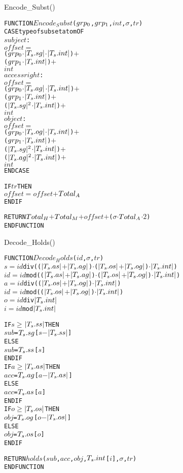 \documentclass[11pt]{report}
\newenvironment{vverbatim}
{
  \begin{alltt}
}
{
    \vspace{-\baselineskip}
  \end{alltt}
}
\newlength{\valgorithmboxwidth}
\newenvironment{valgorithm}[3][tbhp]
{
  \setlength{\valgorithmboxwidth}{\linewidth-2em}

  \begin{valgorithmfloat}[#1]
    \caption{#2}
    \label{#3}
    \hspace{1em}
    \begin{lrbox}{\valgorithmbox}
      \begin{minipage}[l]{\valgorithmboxwidth}
        \small
        \begin{vverbatim}
}
{
        \end{vverbatim}
      \end{minipage}
    \end{lrbox}
    \framebox[\valgorithmboxwidth][l]{\usebox{\valgorithmbox}}
  \end{valgorithmfloat}
}
\begin{document}
        \begin{valgorithm}[tbhp]{Encode\_Subst()}{algo-encode-subst}
FUNCTION \(Encode_Subst\)(\(grp\sb{0}\), \(grp\sb{1}\), \(int\), \(\sigma\), \(tr\))
  CASE type of subset atom OF
    \(subject\) :
      \(offset\) \(=\)
        (\(grp\sb{0}\) \(\cdot\) \(|T\sb{s}.sg|\) \(\cdot\) \(|T\sb{s}.int|\)) \(+\)
        (\(grp\sb{1}\) \(\cdot\) \(|T\sb{s}.int|\)) \(+\)
        \(int\)
    \(access right\) :
      \(offset\) \(=\)
        (\(grp\sb{0}\) \(\cdot\) \(|T\sb{s}.ag|\) \(\cdot\) \(|T\sb{s}.int|\)) \(+\)
        (\(grp\sb{1}\) \(\cdot\) \(|T\sb{s}.int|\)) \(+\)
        (\(|T\sb{s}.sg|\sp{2}\) \(\cdot\) \(|T\sb{s}.int|\)) \(+\)
        \(int\)
    \(object\) :
      \(offset\) \(=\)
        (\(grp\sb{0}\) \(\cdot\) \(|T\sb{s}.og|\) \(\cdot\) \(|T\sb{s}.int|\)) \(+\)
        (\(grp\sb{1}\) \(\cdot\) \(|T\sb{s}.int|\)) \(+\)
        (\(|T\sb{s}.sg|\sp{2}\) \(\cdot\) \(|T\sb{s}.int|\)) \(+\)
        (\(|T\sb{s}.ag|\sp{2}\) \(\cdot\) \(|T\sb{s}.int|\)) \(+\)
        \(int\)
  ENDCASE
    
  IF \(tr\) THEN
    \(offset\) \(=\) \(offset\) \(+\) \(Total\sb{A}\)
  ENDIF

  RETURN \(Total\sb{H}\) \(+\) \(Total\sb{M}\) \(+\) \(offset\) \(+\) (\(\sigma\) \(\cdot\) \(Total\sb{A}\) \(\cdot\) \(2\))
ENDFUNCTION
        \end{valgorithm}


        \begin{valgorithm}[tbhp]{Decode\_Holds()}{algo-decode-holds}
FUNCTION \(Decode_Holds\)(\(id\), \(\sigma\), \(tr\))
  \(s\) \(=\) \(id\) div ((\(|T\sb{s}.as|\) \(+\) \(|T\sb{s}.ag|\)) \(\cdot\) (\(|T\sb{s}.os|\) \(+\) \(|T\sb{s}.og|\)) \(\cdot\) \(|T\sb{s}.int|\))
  \(id\) \(=\) \(id\) mod ((\(|T\sb{s}.as|\) \(+\) \(|T\sb{s}.ag|\)) \(\cdot\) (\(|T\sb{s}.os|\) \(+\) \(|T\sb{s}.og|\)) \(\cdot\) \(|T\sb{s}.int|\))
  \(a\) \(=\) \(id\) div ((\(|T\sb{s}.os|\) \(+\) \(|T\sb{s}.og|\)) \(\cdot\) \(|T\sb{s}.int|\))
  \(id\) \(=\) \(id\) mod ((\(|T\sb{s}.os|\) \(+\) \(|T\sb{s}.og|\)) \(\cdot\) \(|T\sb{s}.int|\))
  \(o\) \(=\) \(id\) div \(|T\sb{s}.int|\)
  \(i\) \(=\) \(id\) mod \(|T\sb{s}.int|\)

  IF \(s\) \(\geq\) \(|T\sb{s}.ss|\) THEN
    \(sub\) = \(T\sb{s}.sg\)[\(s\) \(-\) \(|T\sb{s}.ss|\)]
  ELSE
    \(sub\) = \(T\sb{s}.ss\)[\(s\)]
  ENDIF
  IF \(a\) \(\geq\) \(|T\sb{s}.as|\) THEN
    \(acc\) = \(T\sb{s}.ag\)[\(a\) \(-\) \(|T\sb{s}.as|\)]
  ELSE
    \(acc\) = \(T\sb{s}.as\)[\(a\)]
  ENDIF
  IF \(o\) \(\geq\) \(|T\sb{s}.os|\) THEN
    \(obj\) = \(T\sb{s}.og\)[\(o\) \(-\) \(|T\sb{s}.os|\)]
  ELSE
    \(obj\) = \(T\sb{s}.os\)[\(o\)]
  ENDIF

  RETURN \(holds\)(\(sub\), \(acc\), \(obj\), \(T\sb{s}.int\)[\(i\)], \(\sigma\), \(tr\))
ENDFUNCTION
        \end{valgorithm}
\end{document}
